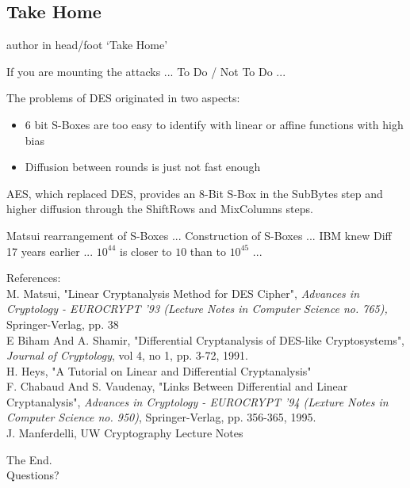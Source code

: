 \documentclass[9pt]{beamer}
\begin{document}
\subsection{Take Home}
\begin{frame}
\begin{beamercolorbox}[ht=2.5ex,dp=1.125ex,center,rounded=true,shadow=true]{author in head/foot}
`Take Home'
\end{beamercolorbox}
\end{frame}

\begin{frame}
If you are mounting the attacks ... To Do / Not To Do ...

\end{frame}

\begin{frame}
The problems of DES originated in two aspects:
\begin{itemize}
\item{6 bit S-Boxes are too easy to identify with linear or affine functions with high bias}
\item{Diffusion between rounds is just not fast enough}
\end{itemize}
AES, which replaced DES, provides an 8-Bit S-Box in the SubBytes step and higher diffusion through the ShiftRows and MixColumns steps. 
\end{frame}

\begin{frame}
Matsui rearrangement of S-Boxes ... Construction of S-Boxes ... IBM knew Diff 17 years earlier ... $10^44$ is closer to $10$ than to $10^45$ ...
\end{frame}

\begin{frame}
References:\\
\vspace{5mm}
M. Matsui, "Linear Cryptanalysis Method for DES Cipher", \textit{Advances in Cryptology - EUROCRYPT '93 (Lecture Notes in Computer Science no. 765),} Springer-Verlag, pp. 38\\
\vspace{2mm}
E Biham And A. Shamir, "Differential Cryptanalysis of DES-like Cryptosystems", \textit{Journal of Cryptology}, vol 4, no 1, pp. 3-72, 1991.\\
\vspace{2mm}
H. Heys, "A Tutorial on Linear and Differential Cryptanalysis"\\
\vspace{2mm}
F. Chabaud And S. Vaudenay, "Links Between Differential and Linear Cryptanalysis", \textit{Advances in Cryptology - EUROCRYPT '94 (Lexture Notes in Computer Science no. 950)}, Springer-Verlag, pp. 356-365, 1995.\\
\vspace{2mm}
J. Manferdelli, UW Cryptography Lecture Notes
\end{frame}

\begin{frame}
\begin{center}
The End.\\
Questions?
\end{center}
\end{frame}
\end{document}
